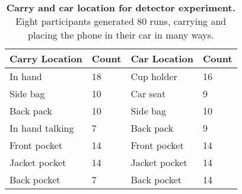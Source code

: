 \begin{table}[t]
{\small
\begin{threeparttable}
\begin{tabularx}{\columnwidth}{b s b s}
  {{\textbf{Carry Location}}} & {{\textbf{Count}}} &
  {{\textbf{Car Location}}} &
  {{\textbf{Count}}} \\
 \hline
In hand & 18 & Cup holder & 16 \\
Side bag & 10 & Car seat  & 9 \\
Back pack & 10 & Side bag & 10 \\
In hand talking & 7 & Back pack & 9 \\
Front pocket & 14 & Front pocket & 14 \\
Jacket pocket & 14 & Jacket pocket & 14 \\
Back pocket & 7 & Back pocket & 14 \\
\end{tabularx}
\end{threeparttable}
\caption{\textbf{Carry and car location for detector experiment.}
Eight participants generated 80 runs, carrying and placing the
phone in their car in many ways.}
\label{table-experiment}
}
\vspace*{-0.1in}
\end{table}

